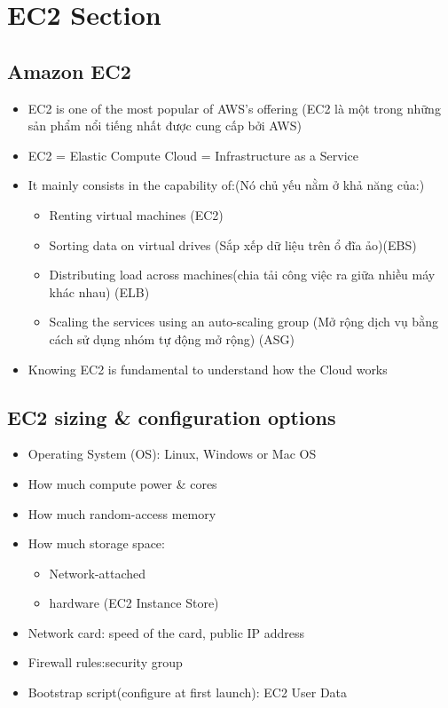\section{EC2 Section}

\subsection{Amazon EC2}

\begin{itemize}
	\item EC2 is one of the most popular of AWS's offering (EC2 là một trong những sản phẩm nổi tiếng nhất được cung cấp bởi AWS)
	\item EC2 = Elastic Compute Cloud = Infrastructure as a Service
	\item It mainly consists in the capability of:(Nó chủ yếu nằm ở khả năng của:)
	\begin{itemize}
		\item Renting virtual machines (EC2)
		\item Sorting data on virtual drives (Sắp xếp dữ liệu trên ổ đĩa ảo)(EBS)
		\item Distributing load across machines(chia tải công việc ra giữa nhiều máy khác nhau) (ELB)
		\item Scaling the services using an auto-scaling group (Mở rộng dịch vụ bằng cách sử dụng nhóm tự động mở rộng) (ASG)
	\end{itemize}
	\item Knowing  EC2 is fundamental to understand how the Cloud works
\end{itemize}

\subsection{EC2 sizing \& configuration options}

\begin{itemize}
	\item Operating System (OS): Linux, Windows or Mac OS
	\item How much compute power \& cores 
	\item How much random-access memory
	\item How much storage space:
	\begin{itemize}
		\item Network-attached
		\item hardware (EC2 Instance Store)
	\end{itemize}
	\item Network card:  speed of the card, public IP address
	\item Firewall rules:security group
	\item Bootstrap script(configure at first launch): EC2 User Data
\end{itemize}

